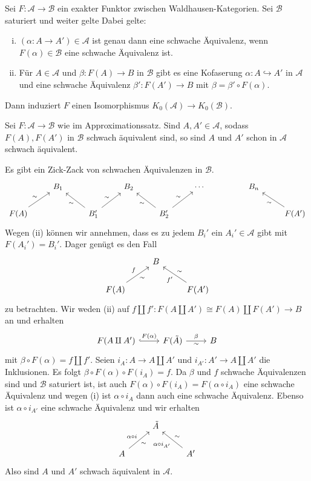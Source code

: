 \begin{satz}[{name=[Approximationssatz]}]
	Sei $F \colon \mathcal{A} \to \mathcal{B}$ ein exakter Funktor zwischen Waldhausen-Kategorien.
	Sei $\mathcal{B}$ saturiert und weiter gelte
	Dabei gelte:
	\begin{enumerate}[(i)]
		\item $(\alpha \colon A \to A') \in \mathcal{A}$ ist genau dann eine schwache Äquivalenz, wenn $F(\alpha) \in \mathcal{B}$ eine schwache Äquivalenz ist.
		\item Für $A \in \mathcal{A}$ und $\beta \colon F(A) \to B$ in $\mathcal{B}$ gibt es eine Kofaserung $\alpha \colon A \hookrightarrow A'$ in $\mathcal{A}$ und eine schwache Äquivalenz $\beta' \colon F(A') \to B$ mit $\beta = \beta' \circ F(\alpha)$.
	\end{enumerate}
	Dann induziert $F$ einen Isomorphismus $K_0(\mathcal{A}) \to K_0(\mathcal{B})$.
\end{satz}

\begin{lemma}
	Sei $F \colon \mathcal{A} \to \mathcal{B}$ wie im Approximationssatz.
	Sind $A,A' \in \mathcal{A}$, sodass $F(A), F(A')$ in $\mathcal{B}$ schwach äquivalent sind, so sind $A$ und $A'$ schon in $\mathcal{A}$ schwach äquivalent.
\end{lemma}
\begin{beweis}
	Es gibt ein Zick-Zack von schwachen Äquivalenzen in $\mathcal{B}$.
	\[
		\begin{tikzcd}
			& B_1 & & B_2 & & \cdots & & B_n \\
			F(A) \urar["\sim"] & & B_1' \ular["\sim"] \urar["\sim"] & &  B_2' \ular["\sim"] \urar["\sim"] & & & & F(A') \ular["\sim"]
		\end{tikzcd}
	\]
	Wegen (ii) können wir annehmen, dass es zu jedem $B_i'$ ein $A_i' \in \mathcal{A}$ gibt mit $F(A_i') = B_i'$.
	Dager genügt es den Fall
	\[
		\begin{tikzcd}
			& B & \\
			F(A)\urar["f","\sim"'] & & F(A')\ular["f'","\sim"']
		\end{tikzcd}
	\]
	zu betrachten.
	Wir weden (ii) auf $f\amalg f' \colon F(A \amalg A') \cong F(A) \amalg F(A') \to B$ an und erhalten 
	\[
		\begin{tikzcd}
			F(A \amalg A') \rar[hook,"F(\alpha)"] & F(\tilde{A}) \rar["\beta","\sim"'] & B
		\end{tikzcd}
	\]
	mit $\beta \circ F(\alpha) = f \amalg f'$.
	Seien $i_A \colon A \to A \amalg A'$ und $i_{A'} \colon A' \to A \amalg A'$ die Inklusionen.
	Es folgt $\beta \circ F(\alpha) \circ F(i_A)=f$.
	Da $\beta$ und $f$ schwache Äquivalenzen sind und $\mathcal{B}$ saturiert ist, ist auch $F(\alpha) \circ F(i_A) = F(\alpha \circ i_A)$ eine schwache Äquivalenz und wegen (i) ist $\alpha \circ i_A$ dann auch eine schwache Äquivalenz.
	Ebenso ist $\alpha \circ i_{A'}$ eine schwache Äquivalenz und wir erhalten
	\[
		\begin{tikzcd}
			& \tilde{A} \\
			A \urar["\alpha \circ i","\sim"'] && A' \ular["\alpha \circ i_{A'}","\sim"']
		\end{tikzcd}
	\]
	Also sind $A$ und $A'$ schwach äquivalent in $\mathcal{A}$.
\end{beweis}

